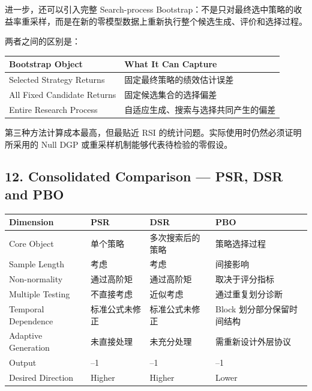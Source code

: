 进一步，还可以引入完整 Search-process Bootstrap：不是只对最终选中策略的收益率重采样，而是在新的零模型数据上重新执行整个候选生成、评价和选择过程。

两者之间的区别是：

\begin{readertable}
\begin{longtable}[]{@{}
  >{\raggedright\arraybackslash}p{}
  >{\raggedright\arraybackslash}p{}@{}}
\toprule
Bootstrap Object & What It Can Capture \\
\midrule
\endhead
Selected Strategy Returns & 固定最终策略的绩效估计误差 \\
All Fixed Candidate Returns & 固定候选集合的选择偏差 \\
Entire Research Process & 自适应生成、搜索与选择共同产生的偏差 \\
\bottomrule
\end{longtable}
\end{readertable}

第三种方法计算成本最高，但最贴近 RSI 的统计问题。实际使用时仍然必须证明所采用的 Null DGP 或重采样机制能够代表待检验的零假设。

\hypertarget{part-4-71-0001-consolidated-comparison-psr-dsr-and-pbo}{%
\subsection{12. Consolidated Comparison --- PSR, DSR and PBO}\label{part-4-71-0001-consolidated-comparison-psr-dsr-and-pbo}}

\begin{readertable}
\begin{longtable}[]{@{}
  >{\raggedright\arraybackslash}p{}
  >{\raggedright\arraybackslash}p{}
  >{\raggedright\arraybackslash}p{}
  >{\raggedright\arraybackslash}p{}@{}}
\toprule
Dimension & PSR & DSR & PBO \\
\midrule
\endhead
Core Object & 单个策略 & 多次搜索后的策略 & 策略选择过程 \\
Sample Length & 考虑 & 考虑 & 间接影响 \\
Non-normality & 通过高阶矩 & 通过高阶矩 & 取决于评分指标 \\
Multiple Testing & 不直接考虑 & 近似考虑 & 通过重复划分诊断 \\
Temporal Dependence & 标准公式未修正 & 标准公式未修正 & Block 划分部分保留时间结构 \\
Adaptive Generation & 未直接处理 & 未充分处理 & 需重新设计外层协议 \\
Output & 0--1 & 0--1 & 0--1 \\
Desired Direction & Higher & Higher & Lower \\
\bottomrule
\end{longtable}
\end{readertable}

